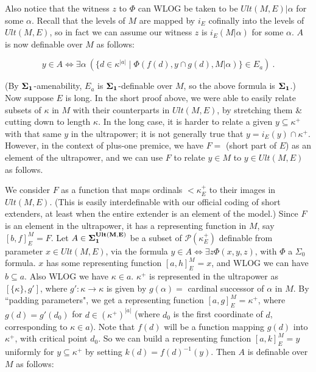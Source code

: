 \documentclass[12pt]{article}
\begin{document}
Also notice that the witness $z$  to $\Phi$ can WLOG be taken to be $Ult(M, E) | \alpha$ for some $\alpha$.  Recall that the levels of $M$ are mapped by $i_E$ cofinally into the levels of $Ult(M, E)$, so in fact we can assume our witness $z$ is $i_E (M | \alpha )$ for some $\alpha$.  $A$ is now definable over $M$ as follows:


\[
y \in A \Longleftrightarrow \exists \alpha \ ( \{ d \in \kappa^{|a|} \mid \Phi ( f(d), y \cap g (d) , M | \alpha ) \} \in E_a ) \ .
\]

(By $\bf{\Sigma}_1$-amenability, $E_{a}$ is $\bf{\Sigma}_1$-definable over $M$, so the above formula is $\bf{\Sigma}_1$.)\\

Now suppose $E$ is long.  In the short proof above, we were able to easily relate subsets of $\kappa$ in $M$ with their counterparts in $Ult(M, E)$, by stretching them \& cutting down to length $\kappa$.  In the long case, it is harder to relate a given $y \subseteq \kappa^+$ with that same $y$ in the ultrapower; it is not generally true that $y = i_E (y) \cap \kappa^+$.  However, in the context of plus-one premice, we have $F = $ (short part of $E$) as an element of the ultrapower, and we can use $F$ to relate $y \in M$ to $y \in Ult(M, E)$ as follows.

We consider $F$ as a function that maps ordinals $< \kappa_E^+$ to their images in $Ult(M,E)$.  (This is easily interdefinable with our official coding of short extenders, at least when the entire extender is an element of the model.) Since $F$ is an element in the ultrapower, it has a representing function in $M$, say $ [b , f]_E^M = F $.  Let $A \in \bf{\Sigma}_1^{Ult(M, E)}$ be a subset of $\mathcal{P} ( \kappa_E^+ )$ definable from parameter $x \in Ult(M, E)$, via the formula $y \in A \Longleftrightarrow \exists z \Phi ( x, y, z )$, with $\Phi$ a $\Sigma_0$ formula.  $x$ has some representing function $ [a, h]_E^M = x$, and WLOG we can have $b \subseteq a$.  Also WLOG we have $\kappa \in a$.  $\kappa^+$ is represented in the ultrapower as $[ \{ \kappa \} , g' ]$, where $g' : \kappa \longrightarrow \kappa$ is given by $g ( \alpha ) =$ cardinal successor of $\alpha$ in $M$.  By ``padding parameters", we get a representing function $[a, g]_E^M = \kappa^+$, where $g(d) = g' ( d_0 )$ for $d \in(\kappa^+ )^{|a|}$ (where $d_0$ is the first coordinate of $d$, corresponding to $\kappa \in a$).  Note that $f (d) $ will be a function mapping $g(d)$ into $\kappa^+$, with critical point $d_0$.  So we can build a representing function $[a , k]_E^M = y$ uniformly for $y \subseteq \kappa^+$ by setting $k (d) = f(d)^{-1} (y)$.  Then $A$ is definable over $M$ as follows:
\end{document}
